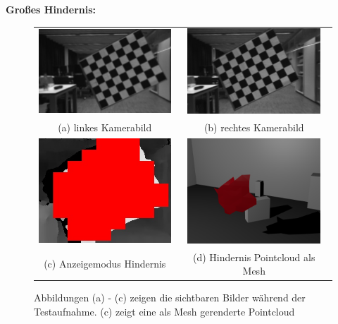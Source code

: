 	\noindent
	\textbf{Großes Hindernis:}\\
	\begin{figure}[h]
		\centering
		\begin{tabular}{c c}
		\includegraphics[width=5.0cm]{img/evaluation/test_set/_test_3_left}&
		\includegraphics[width=5.0cm]{img/evaluation/test_set/_test_3_right}\\
		(a) linkes Kamerabild & (b) rechtes Kamerabild\\
		\includegraphics[width=5.0cm]{img/evaluation/test_set/_test_3_disparity}&
	    \includegraphics[width=5.0cm]{img/evaluation/test_set/rendered_obstacle}\\
		(c) Anzeigemodus Hindernis & (d) Hindernis Pointcloud als Mesh
		\end{tabular}
		\caption{Abbildungen (a) - (c) zeigen die sichtbaren Bilder während der Testaufnahme. (c) zeigt eine als Mesh gerenderte Pointcloud}
		\label{fig:test_viewing}
	\end{figure}
    
